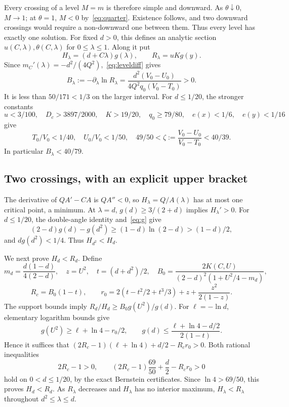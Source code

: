 \documentclass[12pt,letterpaper,onecolumn]{article}
\theoremstyle{definition}
\begin{document}
Every crossing of a level \(M=m\) is therefore simple and downward.
As \(\theta\downarrow0\), \(M\to1\); at \(\theta=1\), \(M<0\) by~\eqref{eq:quarter}.
Existence follows, and two downward crossings would require a non-downward one between them.
Thus every level has exactly one solution.
For fixed \(d>0\), this defines an analytic section \(u(C,\lambda),\theta(C,\lambda)\) for \(0\le\lambda\le1\).
Along it put
\[
H_\lambda=(d+C\lambda)g(\lambda),\qquad
R_\lambda=uKg(y).
\]
Since \(m_C'(\lambda)=-d^2/(4Q^2)\),~\eqref{eq:leveldiff} gives
\begin{equation}\label{eq:B}
B_\lambda:=-\partial_\lambda\ln R_\lambda
=\frac{d^2(V_0-U_0)}{4Q^2q_0(V_0-T_0)}>0.
\end{equation}
It is less than \(50/171<1/3\) on the larger interval.
For \(d\le1/20\), the stronger constants
\[
u<3/100,\quad D_c>3897/2000,\quad K>19/20,\quad
q_0\ge79/80,\quad e(x)<1/6,\quad e(y)<1/16
\]
give
\begin{equation}\label{eq:ratios}
T_0/V_0<1/40,\quad U_0/V_0<1/50,\quad
49/50<\zeta:=\frac{V_0-U_0}{V_0-T_0}<40/39.
\end{equation}
In particular \(B_\lambda<40/79\).

\subsection{Two crossings, with an explicit upper bracket}
The derivative of \(QA'-CA\) is \(QA''<0\), so \(H_\lambda=Q/A(\lambda)\) has at most one critical point, a minimum.
At \(\lambda=d\), \(g(d)\ge3/(2+d)\) implies \(H_\lambda'>0\).
For \(d\le1/20\), the double-angle identity and~\eqref{eq:g} give
\[
(2-d)g(d)-g(d^2)\ge(1-d)\ln(2-d)>(1-d)/2,
\]
and \(dg(d^2)<1/4\). Thus \(H_{d^2}<H_d\).

We next prove \(H_d<R_d\).
Define
\[
m_d=\frac{d(1-d)}{4(2-d)},\quad z=U^2,\quad
t=(d+d^2)/2,\quad
B_0=\frac{2K(C,U)}{(2-d)^2(1+U^2/4-m_d)},
\]
\[
R_c=B_0(1-t),\qquad
r_0=2(t-t^2/2+t^3/3)+z+\frac{z^2}{2(1-z)}.
\]
The support bounds imply
\(R_d/H_d\ge B_0g(U^2)/g(d)\).
For \(\ell=-\ln d\), elementary logarithm bounds give
\[
g(U^2)\ge\ell+\ln4-r_0/2,\qquad
g(d)\le\frac{\ell+\ln4-d/2}{2(1-t)}.
\]
Hence it suffices that
\((2R_c-1)(\ell+\ln4)+d/2-R_cr_0>0\).
Both rational inequalities
\begin{equation}\label{eq:centralcert}
2R_c-1>0,\qquad
(2R_c-1)\frac{69}{50}+\frac d2-R_cr_0>0
\end{equation}
hold on \(0<d\le1/20\), by the exact Bernstein certificates.
Since \(\ln4>69/50\), this proves \(H_d<R_d\).
As \(R_\lambda\) decreases and \(H_\lambda\) has no interior maximum,
\(H_\lambda<R_\lambda\) throughout \(d^2\le\lambda\le d\).
\end{document}
